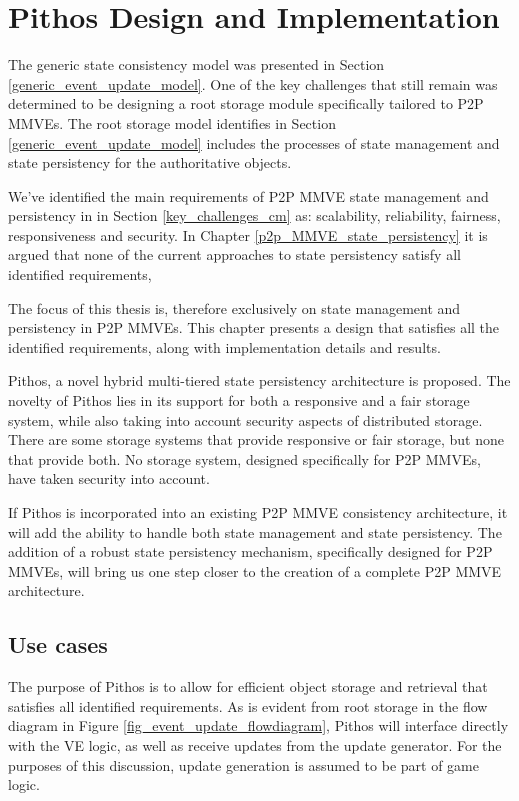 \chapter{Pithos Design and Implementation}
\label{chp:DESIGN}

The generic state consistency model was presented in Section \ref{generic_event_update_model}. One of the key challenges that still remain was determined to be designing a root storage module specifically tailored to P2P MMVEs. The root storage model identifies in Section \ref{generic_event_update_model} includes the processes of state management and state persistency for the authoritative objects.

We've identified the main requirements of P2P MMVE state management and persistency in in Section \ref{key_challenges_cm} as: scalability,
reliability, fairness, responsiveness and security. In Chapter \ref{p2p_MMVE_state_persistency} it is argued that none of the current approaches to state persistency satisfy all identified requirements,

The focus of this thesis is, therefore exclusively on state management and persistency in P2P MMVEs. This chapter presents a design that satisfies all the identified requirements, along with implementation details and results.

Pithos, a novel hybrid multi-tiered state persistency architecture is
proposed. The novelty of Pithos lies in its support for both a responsive and a fair storage system, while also taking into account security aspects
of distributed storage. There are some storage systems that provide responsive or fair storage, but none that provide both. No storage system, designed specifically for P2P MMVEs, have taken security into account.

If Pithos is incorporated into an existing P2P MMVE consistency architecture, it will add the ability to handle both state management and state persistency. The addition of a robust state persistency mechanism, specifically designed for P2P MMVEs, will bring us one step closer to
the creation of a complete P2P MMVE architecture.

\section{Use cases}

The purpose of Pithos is to allow for efficient object storage and retrieval that satisfies all identified requirements. As is evident from root storage in the flow diagram in Figure \ref{fig_event_update_flowdiagram}, Pithos will interface directly with the VE logic, as well as receive updates from the update generator. For the purposes of this discussion, update generation is assumed to be part of game logic.


